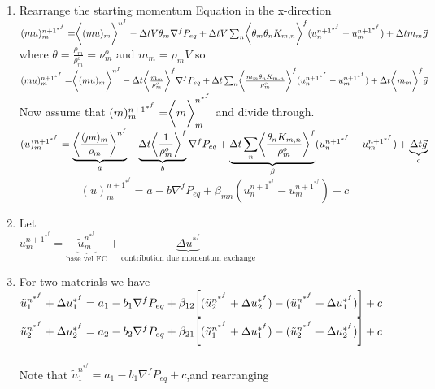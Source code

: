 \documentclass[fleqn]{article}
\newcommand{\B}[1]   {\biggr{#1}}
\begin{document}
\begin{enumerate}
\item Rearrange the starting momentum Equation in the x-direction \\
$    (mu)^{n+1^{*^{f}}}_m 
    = \B<(m u)_m\B>^{n^{f}}
    -\Delta{t} V \theta_m \nabla^{f}P_{eq}
    + \Delta{t} V \sum_n \B<\theta_m \theta_n K_{m,n}\B>^f (u_n^{n+1^{*^{f}}} - u_m^{n+1^{*^{f}}})
    + \Delta{t} m_m \vec{g}
$\\
 where $\theta = \frac{\rho_m}{\rho^o_m}=\nu^o_m$ and $m_m = \rho_m V$ so \\
$    (mu)^{n+1^{*^{f}}}_m 
    = \B<(m u)_m\B>^{n^{f}}
    -\Delta{t} \B<\frac{m_m}{\rho^o_m}\B>^f \nabla^{f}P_{eq}
    + \Delta{t}\sum_n \B<\frac{m_m\theta_n K_{m,n}}{\rho^o_m} \B>^f (u_n^{n+1^{*^{f}}} - u_m^{n+1^{*^{f}}})
    + \Delta{t} \B<m_m\B>^f \vec{g}
$\\ 
Now assume that $(m)^{n+1^{*^{f}}}_m = \B<m\B>^{n^{*^{f}}}_m$ and divide through.\\
$    (u)^{n+1^{*^{f}}}_m 
    = \underbrace{ \B<\frac{(\rho u)_m}{\rho_m}\B>^{n^{f}}  }_a
    - \underbrace{\Delta{t} \B<\frac{1}{\rho^o_m}\B>^f}_b \nabla^{f}P_{eq}
    + \underbrace{\Delta{t}\sum_n \B<\frac{\theta_n K_{m,n}}{\rho^o_m} \B>^f}_\beta  (u_n^{n+1^{*^{f}}} - u_m^{n+1^{*^{f}}})
    + \underbrace{\Delta{t} \vec{g}}_c
$
\[
    (u)^{n+1^{*^{f}}}_m 
    = a
    - b \nabla^{f}P_{eq}
    + \beta_{mn}  (u_n^{n+1^{*^{f}}} - u_m^{n+1^{*^{f}}})
    + c
\]
\item Let \\
$u^{n+1^{*^{f}}}_m = \underbrace{\tilde u^{n^{*^{f}}}_m}_{\text{base vel FC}} 
+ \underbrace{\Delta{u^{*^{f}}}}_{\text{contribution due momentum exchange}}$
\item  For two materials we have\\
$
    \tilde u^{n^{*^{f}}}_1 + \Delta{u^{*^{f}}_1} = a_1 - b_1\nabla^{f}P_{eq} + 
    \beta_{12}\B[(\tilde u^{n^{*^{f}}}_2 + \Delta{u^{*^{f}}_2}) - (\tilde u^{n^{*^{f}}}_1 + \Delta{u^{*^{f}}_1}) \B]
    + c
$\\
$
    \tilde u^{n^{*^{f}}}_2 + \Delta{u^{*^{f}}_2} = a_2 - b_2\nabla^{f}P_{eq} + 
    \beta_{21}\B[(\tilde u^{n^{*^{f}}}_1 + \Delta{u^{*^{f}}_1}) - (\tilde u^{n^{*^{f}}}_2 + \Delta{u^{*^{f}}_2}) \B]
    + c
$\\
\\
Note that $\tilde u^{n^{*^{f}}}_1 = a_1 - b_1\nabla^{f}P_{eq} + c$,and rearranging\\

\end{enumerate}
\end{document}
